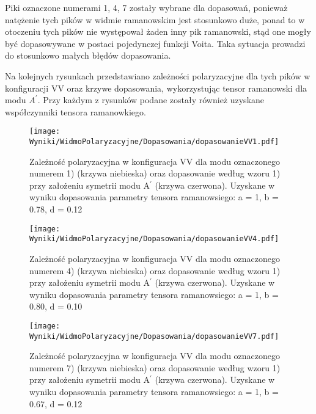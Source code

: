 Piki oznaczone numerami 1, 4, 7 zostały wybrane dla dopasowań, ponieważ natężenie tych pików w widmie ramanowskim jest stosunkowo duże, ponad to w otoczeniu tych pików nie występował żaden inny pik ramanowski, stąd one mogły być dopasowywane w postaci pojedynczej funkcji Voita. Taka sytuacja prowadzi do stosunkowo małych błędów dopasowania. 

Na kolejnych rysunkach przedstawiano zależności polaryzacyjne dla tych pików w konfiguracji VV oraz krzywe dopasowania, wykorzystując tensor ramanowski dla modu $A^{'}$. Przy każdym z rysunków podane zostały również uzyskane współczynniki tensora ramanowkiego.


\begin{figure}[H]
	\begin{center}
		\texttt{[image: Wyniki/WidmoPolaryzacyjne/Dopasowania/dopasowanieVV1.pdf]}
		\caption{Zależność polaryzacyjna w konfiguracja VV dla modu oznaczonego numerem 1) (krzywa niebieska) oraz dopasowanie według wzoru 1) przy założeniu symetrii modu A$^{'}$ (krzywa czerwona). Uzyskane w wyniku dopasowania parametry tensora ramanowsiego: a = 1, b = 0.78, d = 0.12} 
	\end{center}
\end{figure}

\begin{figure}[H]
	\begin{center}
		\texttt{[image: Wyniki/WidmoPolaryzacyjne/Dopasowania/dopasowanieVV4.pdf]}
		\caption{Zależność polaryzacyjna w konfiguracja VV dla modu oznaczonego numerem 4) (krzywa niebieska) oraz dopasowanie według wzoru 1) przy założeniu symetrii modu A$^{'}$ (krzywa czerwona). Uzyskane w wyniku dopasowania parametry tensora ramanowsiego: a = 1, b = 0.80, d = 0.10}
	\end{center}
\end{figure}

\begin{figure}[H]
	\begin{center}
		\texttt{[image: Wyniki/WidmoPolaryzacyjne/Dopasowania/dopasowanieVV7.pdf]}
		\caption{Zależność polaryzacyjna w konfiguracja VV dla modu oznaczonego numerem 7) (krzywa niebieska) oraz dopasowanie według wzoru 1) przy założeniu symetrii modu A$^{'}$ (krzywa czerwona). Uzyskane w wyniku dopasowania parametry tensora ramanowsiego: a = 1, b = 0.67, d = 0.12} 
	\end{center}
\end{figure}

